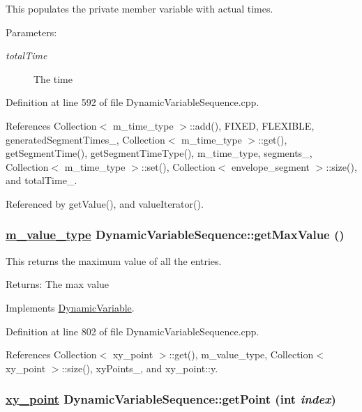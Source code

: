 This populates the private member variable with actual times. \begin{Desc}
\item[Parameters:]
\begin{description}
\item[{\em total\-Time}]The time \end{description}
\end{Desc}


Definition at line 592 of file Dynamic\-Variable\-Sequence.cpp.

References Collection$<$ m\_\-time\_\-type $>$::add(), FIXED, FLEXIBLE, generated\-Segment\-Times\_\-, Collection$<$ m\_\-time\_\-type $>$::get(), get\-Segment\-Time(), get\-Segment\-Time\-Type(), m\_\-time\_\-type, segments\_\-, Collection$<$ m\_\-time\_\-type $>$::set(), Collection$<$ envelope\_\-segment $>$::size(), and total\-Time\_\-.

Referenced by get\-Value(), and value\-Iterator().\hypertarget{classDynamicVariableSequence_a26}{
\subsubsection[getMaxValue]{\setlength{\rightskip}{0pt plus 5cm}\hyperlink{Types_8h_a3}{m\_\-value\_\-type} Dynamic\-Variable\-Sequence::get\-Max\-Value ()}}
\label{classDynamicVariableSequence_a26}


This returns the maximum value of all the entries. \begin{Desc}
\item[Returns:]The max value \end{Desc}


Implements \hyperlink{classDynamicVariable_a5}{Dynamic\-Variable}.

Definition at line 802 of file Dynamic\-Variable\-Sequence.cpp.

References Collection$<$ xy\_\-point $>$::get(), m\_\-value\_\-type, Collection$<$ xy\_\-point $>$::size(), xy\-Points\_\-, and xy\_\-point::y.\hypertarget{classDynamicVariableSequence_a15}{
\subsubsection[getPoint]{\setlength{\rightskip}{0pt plus 5cm}\hyperlink{structxy__point}{xy\_\-point} Dynamic\-Variable\-Sequence::get\-Point (int {\em index})}}
\label{classDynamicVariableSequence_a15}


